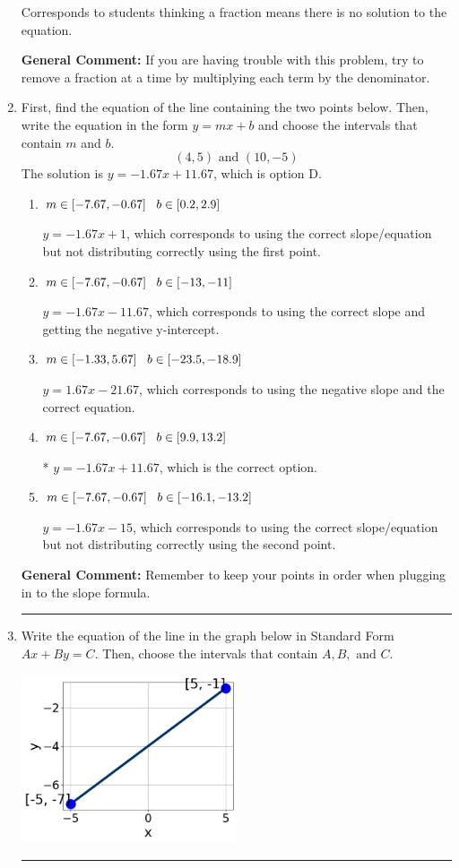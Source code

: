 \documentclass{extbook}[14pt]
\newcommand{\litem}[1]{\item #1

\rule{\textwidth}{0.4pt}}
\begin{document}
\begin{enumerate}
{\begin{enumerate}[label=\Alph*.]
Corresponds to students thinking a fraction means there is no solution to the equation.
\end{enumerate}

\textbf{General Comment:} If you are having trouble with this problem, try to remove a fraction at a time by multiplying each term by the denominator.
}
\litem{
First, find the equation of the line containing the two points below. Then, write the equation in the form $ y=mx+b $ and choose the intervals that contain $m$ and $b$.
\[ (4, 5) \text{ and } (10, -5) \]The solution is \( y = -1.67x + 11.67 \), which is option D.\begin{enumerate}[label=\Alph*.]
\item \( m \in [-7.67, -0.67] \hspace*{3mm} b \in [0.2, 2.9] \)

 $y = -1.67x + 1$, which corresponds to using the correct slope/equation but not distributing correctly using the first point.
\item \( m \in [-7.67, -0.67] \hspace*{3mm} b \in [-13, -11] \)

 $y = -1.67x -11.67$, which corresponds to using the correct slope and getting the negative y-intercept.
\item \( m \in [-1.33, 5.67] \hspace*{3mm} b \in [-23.5, -18.9] \)

 $y = 1.67x -21.67$, which corresponds to using the negative slope and the correct equation.
\item \( m \in [-7.67, -0.67] \hspace*{3mm} b \in [9.9, 13.2] \)

* $y = -1.67x + 11.67$, which is the correct option.
\item \( m \in [-7.67, -0.67] \hspace*{3mm} b \in [-16.1, -13.2] \)

 $y = -1.67x -15$, which corresponds to using the correct slope/equation but not distributing correctly using the second point.
\end{enumerate}

\textbf{General Comment:} Remember to keep your points in order when plugging in to the slope formula.
}
\litem{
Write the equation of the line in the graph below in Standard Form $Ax+By=C$. Then, choose the intervals that contain $A, B, \text{ and } C$.

\begin{center}
    \includegraphics[width=0.5\textwidth]{../Figures/linearGraphToStandardB.png}
\end{center}


}
\end{enumerate}
\end{document}
